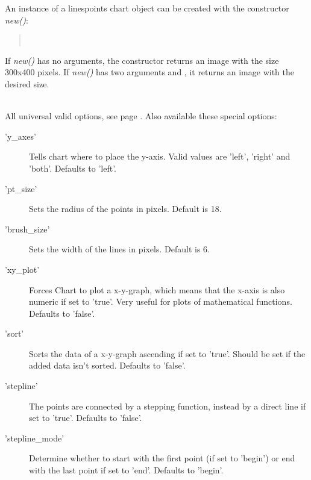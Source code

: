\begin{Constructor} 
An instance of a linespoints chart object can be created with the constructor 
\textit{new()}:
\begin{quote}
\parindent 0pt
\\
\end{quote}

If \textit{new()} has no arguments, the constructor returns an image with the size 300x400 pixels.
If \textit{new()} has two arguments  and , 
it returns an image with the desired size.
\end{Constructor}

\Methods
{} \\[\parabstand]
%
\Attributes
All universal valid options, see page \pageref{options}. 
Also available these special options:
\begin{description}
\item['y\_axes'] Tells chart where to place the y-axis. 
     Valid values are 'left', 'right' and 'both'. Defaults to 'left'.

\item['pt\_size'] Sets the radius of the points in pixels. Default is 18.

\item['brush\_size'] Sets the width of the lines in pixels. Default is 6.

\item['xy\_plot'] Forces Chart to plot a x-y-graph, 
                  which means that the x-axis is also numeric if set to 'true'. 
                  Very useful for plots of mathematical functions. Defaults to 'false'.

\item['sort'] Sorts the data of a x-y-graph ascending if set to 'true'. 
              Should be set if the added data isn't sorted. Defaults to 'false'.  
              
\item['stepline'] The points are connected by a stepping function,
                  instead by a direct line if set to 'true'. 
                  Defaults to 'false'.   

\item['stepline\_mode'] Determine whether to start with the first point
                    (if set to 'begin') or end with the last point if set to 'end'.
                    Defaults to 'begin'.   
\end{description}
